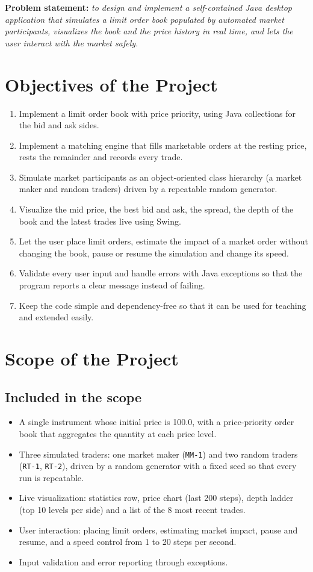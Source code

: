 \documentclass[12pt,a4paper,openany,oneside]{report}
\newcommand{\code}[1]{\texttt{#1}}
\begin{document}
\textbf{Problem statement:} \emph{to design and implement a self-contained Java desktop application that simulates a limit order book populated by automated market participants, visualizes the book and the price history in real time, and lets the user interact with the market safely.}

\section{Objectives of the Project}

\begin{enumerate}
  \item Implement a limit order book with price priority, using Java collections for the bid and ask sides.
  \item Implement a matching engine that fills marketable orders at the resting price, rests the remainder and records every trade.
  \item Simulate market participants as an object-oriented class hierarchy (a market maker and random traders) driven by a repeatable random generator.
  \item Visualize the mid price, the best bid and ask, the spread, the depth of the book and the latest trades live using Swing.
  \item Let the user place limit orders, estimate the impact of a market order without changing the book, pause or resume the simulation and change its speed.
  \item Validate every user input and handle errors with Java exceptions so that the program reports a clear message instead of failing.
  \item Keep the code simple and dependency-free so that it can be used for teaching and extended easily.
\end{enumerate}

\section{Scope of the Project}

\subsection*{Included in the scope}
\begin{itemize}
  \item A single instrument whose initial price is 100.0, with a price-priority order book that aggregates the quantity at each price level.
  \item Three simulated traders: one market maker (\code{MM-1}) and two random traders (\code{RT-1}, \code{RT-2}), driven by a random generator with a fixed seed so that every run is repeatable.
  \item Live visualization: statistics row, price chart (last 200 steps), depth ladder (top 10 levels per side) and a list of the 8 most recent trades.
  \item User interaction: placing limit orders, estimating market impact, pause and resume, and a speed control from 1 to 20 steps per second.
  \item Input validation and error reporting through exceptions.
\end{itemize}
\end{document}
